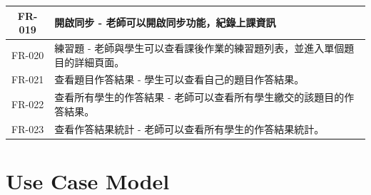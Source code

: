 \documentclass[12pt]{article}
\begin{document}
\begin{table}[H]
\begin{tabular}{|c|p{15cm}|}
    FR-019 & 開啟同步 - 老師可以開啟同步功能，紀錄上課資訊 \\  \hline
    FR-020 & 練習題 - 老師與學生可以查看課後作業的練習題列表，並進入單個題目的詳細頁面。\\ \hline
    FR-021 & 查看題目作答結果 - 學生可以查看自己的題目作答結果。 \\ \hline
    FR-022 & 查看所有學生的作答結果 - 老師可以查看所有學生繳交的該題目的作答結果。 \\ \hline 
    FR-023 & 查看作答結果統計 - 老師可以查看所有學生的作答結果統計。 \\ \hline
  \end{tabular}
\end{table}

\section{Use Case Model}
\end{document}
